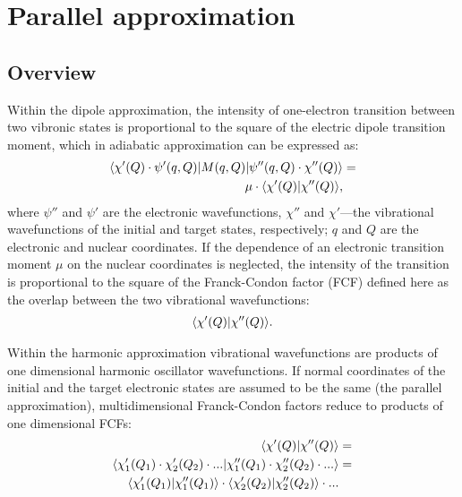 \documentclass[11pt]{article}
\begin{document}
\section{Parallel approximation}
\label{sec:parallel}

\subsection{Overview}
\label{sec:para:overview}

Within the dipole approximation, the intensity of one-electron transition between two vibronic states
is proportional to the square of the electric dipole transition moment, which
in adiabatic approximation can be expressed as:
\begin{align}
\langle \chi '(Q)\cdot\psi'(q,Q)| M(q,Q) |\psi''(q,Q)\cdot\chi''(Q)\rangle & = \nonumber\\
\mu \cdot \langle \chi '(Q)|\chi ''(Q)\rangle, & 
\end{align}
where
$\psi''$ and $\psi'$ are the electronic wavefunctions, $\chi''$ and $\chi'$---the vibrational wavefunctions
of the initial and target states, respectively;
$q$ and $Q$ are the electronic and nuclear coordinates.
If the dependence 
of an electronic transition moment $\mu$  on the nuclear coordinates is neglected,
the intensity of the transition is proportional to the square of the 
Franck-Condon factor (FCF)\cite{Franck:25,Condon:26,Gozem:2021:ezSpectra}
defined here as the overlap between the two vibrational wavefunctions:
\begin{align}
\langle \chi '(Q)|\chi ''(Q)\rangle.
\end{align}

Within the harmonic approximation vibrational wavefunctions are products of
one dimensional harmonic oscillator wavefunctions. 
If normal coordinates of the initial and the target electronic states are assumed to be the same
(the parallel approximation),
multidimensional Franck-Condon factors reduce to products of one dimensional FCFs:
\begin{align}
\langle \chi'(Q)|\chi''(Q)\rangle&=\nonumber\\
\langle \chi'_1(Q_1)\cdot\chi'_2(Q_2)\cdot...|\chi''_1(Q_1)\cdot\chi''_2(Q_2)\cdot...\rangle&=\nonumber\\
\langle \chi'_1(Q_1)|\chi''_1(Q_1)\rangle\cdot\langle \chi'_2(Q_2)|\chi''_2(Q_2)\rangle\cdot...&
\label{eq:product_fcf}
\end{align}
\end{document}
